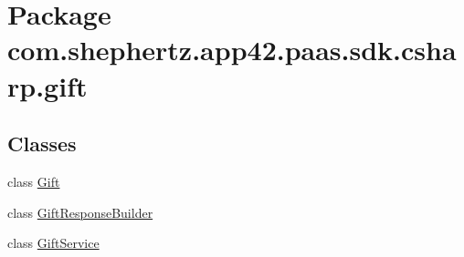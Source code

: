 \hypertarget{namespacecom_1_1shephertz_1_1app42_1_1paas_1_1sdk_1_1csharp_1_1gift}{\section{Package com.\+shephertz.\+app42.\+paas.\+sdk.\+csharp.\+gift}
\label{namespacecom_1_1shephertz_1_1app42_1_1paas_1_1sdk_1_1csharp_1_1gift}
}
\subsection*{Classes}
\begin{DoxyCompactItemize}
\item 
class \hyperlink{classcom_1_1shephertz_1_1app42_1_1paas_1_1sdk_1_1csharp_1_1gift_1_1_gift}{Gift}
\item 
class \hyperlink{classcom_1_1shephertz_1_1app42_1_1paas_1_1sdk_1_1csharp_1_1gift_1_1_gift_response_builder}{Gift\+Response\+Builder}
\item 
class \hyperlink{classcom_1_1shephertz_1_1app42_1_1paas_1_1sdk_1_1csharp_1_1gift_1_1_gift_service}{Gift\+Service}
\end{DoxyCompactItemize}
